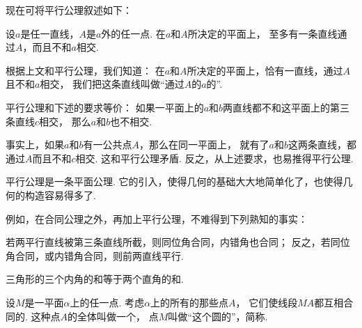 现在可将平行公理叙述如下：
\begin{axiom}\label{axiom:欧式几何.平行公理}
设\(a\)是任一直线，\(A\)是\(a\)外的任一点.
在\(a\)和\(A\)所决定的平面上，
至多有一条直线通过\(A\)，而且不和\(a\)相交.
\end{axiom}

根据上文和平行公理，我们知道：
在\(a\)和\(A\)所决定的平面上，恰有一直线，通过\(A\)且不和\(a\)相交，
我们把这条直线叫做“通过\(A\)的\(a\)的”.

平行公理和下述的要求等价：
如果一平面上的\(a\)和\(b\)两直线都不和这平面上的第三条直线\(c\)相交，
那么\(a\)和\(b\)也不相交.

事实上，如果\(a\)和\(b\)有一公共点\(A\)，那么在同一平面上，
就有了\(a\)和\(b\)这两条直线，都通过\(A\)而且不和\(c\)相交.
这和平行公理矛盾.
反之，从上述要求，也易推得平行公理.

平行公理是一条平面公理.
它的引入，使得几何的基础大大地简单化了，也使得几何的构造容易得多了.

例如，在合同公理之外，再加上平行公理，不难得到下列熟知的事实：
\begin{theorem}\label{theorem:欧式几何.定理30}
若两平行直线被第三条直线所截，则同位角合同，内错角也合同；
反之，若同位角合同，或内错角合同，则前两直线平行.
\end{theorem}

\begin{theorem}\label{theorem:欧式几何.定理31}
三角形的三个内角的和等于两个直角的和.
\end{theorem}
\begin{figure}[ht]
	\centering
\end{figure}

\begin{definition}
设\(M\)是一平面\(\alpha\)上的任一点.
考虑\(\alpha\)上的所有的那些点\(A\)，
它们使线段\(MA\)都互相合同的.
这种点\(A\)的全体叫做一个，
点\(M\)叫做“这个圆的”，简称.
\end{definition}

